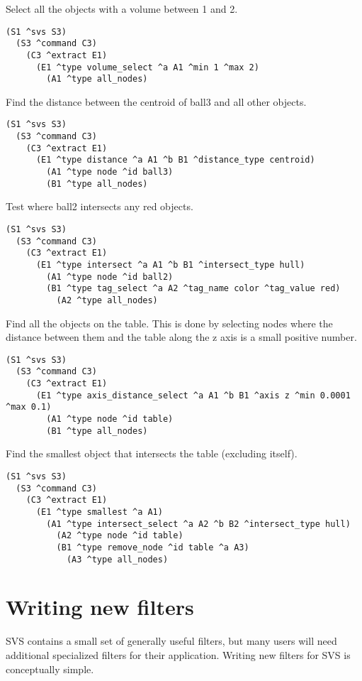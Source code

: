 Select all the objects with a volume between 1 and 2. 
\begin{verbatim}
(S1 ^svs S3)
  (S3 ^command C3)
    (C3 ^extract E1)
      (E1 ^type volume_select ^a A1 ^min 1 ^max 2)
        (A1 ^type all_nodes)
\end{verbatim} 

Find the distance between the centroid of ball3 and all other objects. 
\begin{verbatim}
(S1 ^svs S3)
  (S3 ^command C3)
    (C3 ^extract E1)
      (E1 ^type distance ^a A1 ^b B1 ^distance_type centroid)
        (A1 ^type node ^id ball3)
        (B1 ^type all_nodes)
\end{verbatim} 

Test where ball2 intersects any red objects. 
\begin{verbatim}
(S1 ^svs S3)
  (S3 ^command C3)
    (C3 ^extract E1)
      (E1 ^type intersect ^a A1 ^b B1 ^intersect_type hull)
        (A1 ^type node ^id ball2)
        (B1 ^type tag_select ^a A2 ^tag_name color ^tag_value red)
          (A2 ^type all_nodes)
\end{verbatim}

Find all the objects on the table. This is done by selecting nodes 
where the distance between them and the table along the z axis is a small positive number. 
\begin{verbatim}
(S1 ^svs S3)
  (S3 ^command C3)
    (C3 ^extract E1)
      (E1 ^type axis_distance_select ^a A1 ^b B1 ^axis z ^min 0.0001 ^max 0.1)
        (A1 ^type node ^id table)
        (B1 ^type all_nodes)
\end{verbatim}

Find the smallest object that intersects the table (excluding itself). 
\begin{verbatim}
(S1 ^svs S3)
  (S3 ^command C3)
    (C3 ^extract E1)
      (E1 ^type smallest ^a A1)
        (A1 ^type intersect_select ^a A2 ^b B2 ^intersect_type hull)
          (A2 ^type node ^id table)
          (B1 ^type remove_node ^id table ^a A3)
            (A3 ^type all_nodes)
\end{verbatim}




\section{Writing new filters}

SVS contains a small set of generally useful filters, but many users will need additional specialized filters for their application.
Writing new filters for SVS is conceptually simple.


